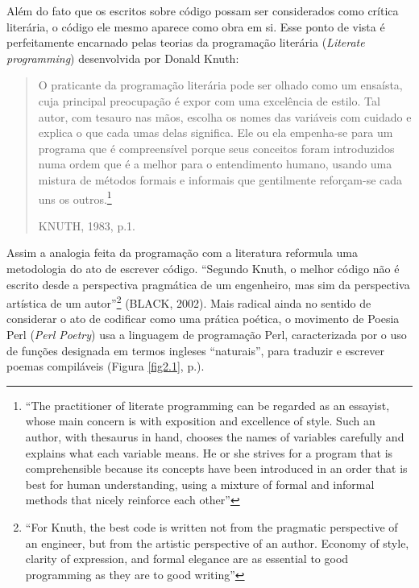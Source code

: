 Além do fato que os escritos sobre código possam ser considerados como crítica literária, o código ele mesmo aparece como obra em si. Esse ponto de vista é perfeitamente encarnado pelas teorias da programação literária (\emph{Literate programming}) desenvolvida por Donald Knuth:

\begin{quote}
O praticante da programação literária pode ser olhado como um ensaísta, cuja principal preocupação é expor com uma excelência de estilo. Tal autor, com tesauro nas mãos, escolha os nomes das variáveis com cuidado e explica o que cada umas delas significa. Ele ou ela empenha-se para um programa que é compreensível porque seus conceitos foram introduzidos numa ordem que é a melhor para o entendimento humano, usando uma mistura de métodos formais e informais que gentilmente reforçam-se cada uns os outros.\footnote{“The practitioner of literate programming can be regarded as an essayist, whose main concern is with exposition and excellence of style. Such an author, with thesaurus in hand, chooses the names of variables carefully and explains what each variable means. He or she strives for a program that is comprehensible because its concepts have been introduced in an order that is best for human understanding, using a mixture of formal and informal methods that nicely reinforce each other”}
\begin{flushright}
KNUTH, 1983, p.1.
\end{flushright}
\end{quote}

Assim a analogia feita da programação com a literatura reformula uma metodologia do ato de escrever código. “Segundo Knuth, o melhor código não é escrito desde a perspectiva pragmática de um engenheiro, mas sim da perspectiva artística de um autor”\footnote{“For Knuth, the best code is written not from the pragmatic perspective of an engineer, but from the artistic perspective of an author. Economy of style, clarity of expression, and formal elegance are as essential to good programming as they are to good writing”} (BLACK, 2002). Mais radical ainda no sentido de considerar o ato de codificar como uma prática poética, o movimento de Poesia Perl (\emph{Perl Poetry}) usa a linguagem de programação Perl, caracterizada por o uso de funções designada em termos ingleses “naturais”, para traduzir e escrever poemas compiláveis (Figura \ref{fig2.1}, p.\pageref{fig2.1}).

